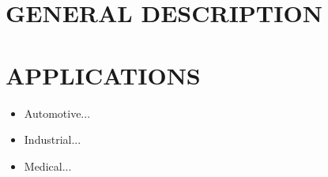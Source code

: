 \documentclass{../templates/datasheet}
\begin{document}
\section{GENERAL DESCRIPTION}


\section{APPLICATIONS} %

\begin{itemize}
	\item Automotive...
	\item Industrial...
	\item Medical...
\end{itemize}


\pagebreak

\tableofcontents
\pagebreak



\end{document}
